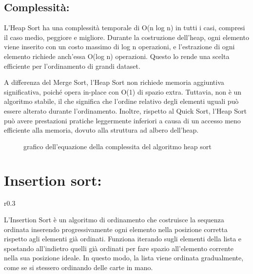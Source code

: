 \documentclass[a4paper]{article}
\begin{document}
\subsection{Complessità:}
L’Heap Sort ha una complessità temporale di O(n log n) in tutti i casi, compresi il caso medio, peggiore e migliore. Durante la costruzione dell’heap, ogni 
elemento viene inserito con un costo massimo di log n operazioni, e l’estrazione di ogni elemento richiede anch’essa O(log n) operazioni. Questo lo rende 
una scelta efficiente per l’ordinamento di grandi dataset.

A differenza del Merge Sort, l’Heap Sort non richiede memoria aggiuntiva significativa, poiché opera in-place con O(1) di spazio extra. Tuttavia, non è 
un algoritmo stabile, il che significa che l’ordine relativo degli elementi uguali può essere alterato durante l’ordinamento. Inoltre, rispetto al Quick 
Sort, l’Heap Sort può avere prestazioni pratiche leggermente inferiori a causa di un accesso meno efficiente alla memoria, dovuto alla struttura ad albero dell’heap.
\begin{figure}[H]
    \caption{grafico dell'equazione della complessita del algoritmo heap sort}
\end{figure}
\section{Insertion sort:}
\begin{wrapfigure}{r}{0.3\textwidth}
        \begin{center}
        \end{center}
\end{wrapfigure}
L’Insertion Sort è un algoritmo di ordinamento che costruisce la sequenza ordinata inserendo progressivamente ogni elemento nella posizione corretta rispetto 
agli elementi già ordinati. Funziona iterando sugli elementi della lista e spostando all’indietro quelli già ordinati per fare spazio all’elemento corrente 
nella sua posizione ideale. In questo modo, la lista viene ordinata gradualmente, come se si stessero ordinando delle carte in mano.
\end{document}
